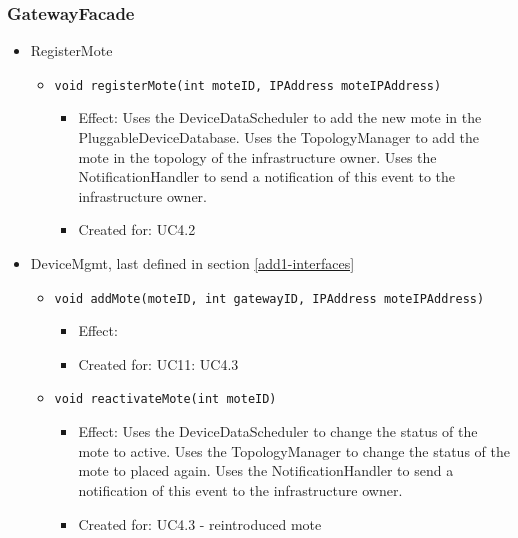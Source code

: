     \subsubsection{GatewayFacade}
        \begin{itemize}
            \item RegisterMote
            \begin{itemize}
                \item \texttt{void registerMote(int moteID, IPAddress moteIPAddress)}
                    \begin{itemize}
                        \item Effect: Uses the DeviceDataScheduler to add the new mote in the PluggableDeviceDatabase.
                              Uses the TopologyManager to add the mote in the topology of the infrastructure owner.
                              Uses the NotificationHandler to send a notification of this event to the infrastructure owner.
                        \item Created for: UC4.2
                    \end{itemize}
            \end{itemize}

            \item DeviceMgmt, last defined in section \ref{add1-interfaces}
            \begin{itemize}
                \item \texttt{void addMote(moteID, int gatewayID, IPAddress moteIPAddress)}
                \begin{itemize}
                    \item Effect:
                    \item Created for: UC11: UC4.3
                \end{itemize}
                \item \texttt{void reactivateMote(int moteID)}
                \begin{itemize}
                    \item Effect: Uses the DeviceDataScheduler to change the status of the mote to active.
                          Uses the TopologyManager to change the status of the mote to placed again.
                          Uses the NotificationHandler to send a notification of this event to the infrastructure owner.
                    \item Created for: UC4.3 - reintroduced mote
                \end{itemize}
            \end{itemize}
        \end{itemize}


